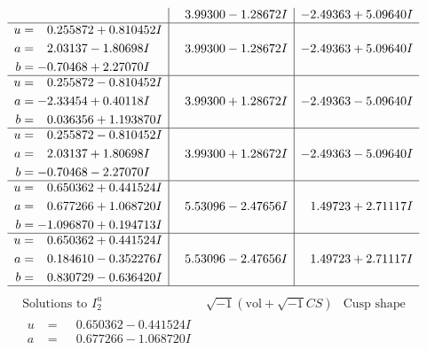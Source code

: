 \documentclass[1p]{elsarticle_modified}
\theoremstyle{definition}
\newcommand{\I}{\sqrt{-1}}
\begin{document}
$$\begin{array}{c|c|c}
 & \phantom{-}3.99300 - 1.28672 I & -2.49363 + 5.09640 I \\ \hline\begin{aligned}
u &= \phantom{-}0.255872 + 0.810452 I \\
a &= \phantom{-}2.03137 - 1.80698 I \\
b &= -0.70468 + 2.27070 I\end{aligned}
 & \phantom{-}3.99300 - 1.28672 I & -2.49363 + 5.09640 I \\ \hline\begin{aligned}
u &= \phantom{-}0.255872 - 0.810452 I \\
a &= -2.33454 + 0.40118 I \\
b &= \phantom{-}0.036356 + 1.193870 I\end{aligned}
 & \phantom{-}3.99300 + 1.28672 I & -2.49363 - 5.09640 I \\ \hline\begin{aligned}
u &= \phantom{-}0.255872 - 0.810452 I \\
a &= \phantom{-}2.03137 + 1.80698 I \\
b &= -0.70468 - 2.27070 I\end{aligned}
 & \phantom{-}3.99300 + 1.28672 I & -2.49363 - 5.09640 I \\ \hline\begin{aligned}
u &= \phantom{-}0.650362 + 0.441524 I \\
a &= \phantom{-}0.677266 + 1.068720 I \\
b &= -1.096870 + 0.194713 I\end{aligned}
 & \phantom{-}5.53096 - 2.47656 I & \phantom{-}1.49723 + 2.71117 I \\ \hline\begin{aligned}
u &= \phantom{-}0.650362 + 0.441524 I \\
a &= \phantom{-}0.184610 - 0.352276 I \\
b &= \phantom{-}0.830729 - 0.636420 I\end{aligned}
 & \phantom{-}5.53096 - 2.47656 I & \phantom{-}1.49723 + 2.71117 I\\
 \hline 
 \end{array}$$\newpage$$\begin{array}{c|c|c}  
\text{Solutions to }I^u_{2}& \I (\text{vol} + \sqrt{-1}CS) & \text{Cusp shape}\\
 \hline 
\begin{aligned}
u &= \phantom{-}0.650362 - 0.441524 I \\
a &= \phantom{-}0.677266 - 1.068720 I \\

\end{aligned}
\end{array}$$
\end{document}
